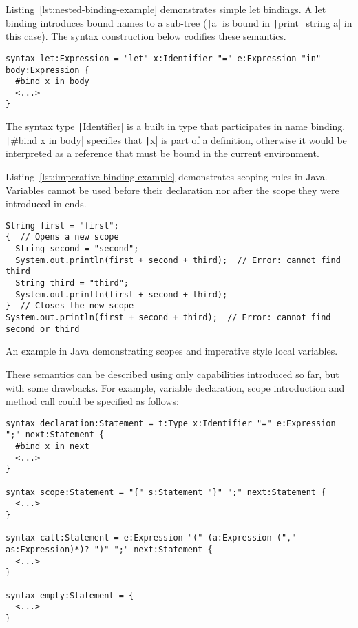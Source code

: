 \documentclass{kththesis}
\begin{document}
Listing~\ref{lst:nested-binding-example} demonstrates simple let bindings. A let binding introduces bound names to a sub-tree (\texttt|a| is bound in \texttt|print_string a| in this case). The syntax construction below codifies these semantics.

\begin{verbatim}
syntax let:Expression = "let" x:Identifier "=" e:Expression "in" body:Expression {
  #bind x in body
  <...>
}
\end{verbatim}

The syntax type \texttt|Identifier| is a built in type that participates in name binding. \texttt|#bind x in body| specifies that \texttt|x| is part of a definition, otherwise it would be interpreted as a reference that must be bound in the current environment.

Listing~\ref{lst:imperative-binding-example} demonstrates scoping rules in Java. Variables cannot be used before their declaration nor after the scope they were introduced in ends.

\begin{listing}
\begin{verbatim}
String first = "first";
{  // Opens a new scope
  String second = "second";
  System.out.println(first + second + third);  // Error: cannot find third
  String third = "third";
  System.out.println(first + second + third);
}  // Closes the new scope
System.out.println(first + second + third);  // Error: cannot find second or third
\end{verbatim}
\caption{An example in Java demonstrating scopes and imperative style local variables.}
\label{lst:imperative-binding-example}
\end{listing}

These semantics can be described using only capabilities introduced so far, but with some drawbacks. For example, variable declaration, scope introduction and method call could be specified as follows:

\begin{verbatim}
syntax declaration:Statement = t:Type x:Identifier "=" e:Expression ";" next:Statement {
  #bind x in next
  <...>
}

syntax scope:Statement = "{" s:Statement "}" ";" next:Statement {
  <...>
}

syntax call:Statement = e:Expression "(" (a:Expression ("," as:Expression)*)? ")" ";" next:Statement {
  <...>
}

syntax empty:Statement = {
  <...>
}
\end{verbatim}
\end{document}
